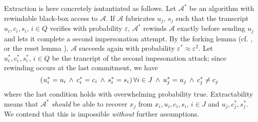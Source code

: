 \documentclass[psamsfonts, reqno]{amsart}
\theoremstyle{definition}
\theoremstyle{remark}
\numberwithin{equation}{section}
\begin{document}
Extraction is here concretely isntantiated as follows.
Let $\mathcal{A}^*$ be an algorithm with rewindable
black-box access to $\mathcal{A}$.
If $\mathcal{A}$ fabricates
$u_j,\hspace{2pt} s_j$ such that
the transcript $u_i, c_i, s_i,\hspace{2pt} i \in Q$
verifies with probability $\varepsilon$,
$\mathcal{A}^*$ rewinds $\mathcal{A}$
exactly before sending $u_j$ and
lets it complete a second impersonation attempt.
By the forking lemma
(cf. \cite{paper_bellare_musig},
or the reset lemma \cite{paper_bellare_palacio}),
$\mathcal{A}$ succeeds again with probability
$\varepsilon^* \approx \varepsilon ^ 2$.
Let $u_i^*, c_i^*, s_i^*,\hspace{2pt}i \in Q$ be the
trancript of the second impesonation attack;
since rewinding occurs at the last commitment, we have
\vspace{3pt}
\begin{equation}\label{rewinding_condition}
(
	\hspace{0.5pt}
	u_i^* = u_i
	\hspace{2pt}
	\land
	\hspace{2pt}
	c_i^* = c_i
	\hspace{2pt}
	\land
	\hspace{2pt}
	s_i^* = s_i
	\hspace{0.5pt}
)\hspace{1.5pt}\forall i \in J
\hspace{2pt}
\land
\hspace{2pt}
u_j^* = u_j
\hspace{2pt}
\land
\hspace{2pt}
c_j^* \neq c_j
\vspace{3pt}
\end{equation}
where the last condition holds with overwhelming probability true.
Extractability means that
$\mathcal{A}^*$ \textit{should} be able to recover $x_j$
from $x_i, u_i, c_i, s_i,\hspace{2pt} i \in J$
and $u_j, c_j^*, s_j^*$.
We contend that this is impossible
\textit{without} further assumptions.
\end{document}
